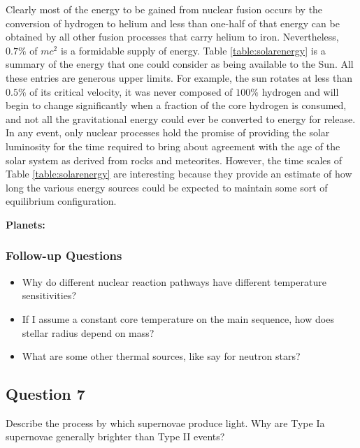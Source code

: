 \documentclass[a4paper,10pt]{article}
\begin{document}
{\noindent}Clearly most of the energy to be gained from nuclear fusion occurs by the conversion of hydrogen to helium and less than one-half of that energy can be obtained by all other fusion processes that carry helium to iron. Nevertheless, $0.7\%$ of $mc^2$ is a formidable supply of energy. Table \ref{table:solarenergy} is a summary of the energy that one could consider as being available to the Sun. All these entries are generous upper limits. For example, the sun rotates at less than $0.5\%$ of its critical velocity, it was never composed of $100\%$ hydrogen and will begin to change significantly when a fraction of the core hydrogen is consumed, and not all the gravitational energy could ever be converted to energy for release. In any event, only nuclear processes hold the promise of providing the solar luminosity for the time required to bring about agreement with the age of the solar system as derived from rocks and meteorites. However, the time scales of Table \ref{table:solarenergy} are interesting because they provide an estimate of how long the various energy sources could be expected to maintain some sort of equilibrium configuration.

{\noindent}\textbf{Planets:}

\subsubsection{Follow-up Questions}

\begin{itemize}
    \item Why do different nuclear reaction pathways have different temperature sensitivities?
    \item If I assume a constant core temperature on the main sequence, how does stellar radius depend on mass?
    \item What are some other thermal sources, like say for neutron stars?
\end{itemize}


\newpage
\subsection{Question 7}

Describe the process by which supernovae produce light. Why are Type Ia supernovae generally brighter than Type II events?
\end{document}
